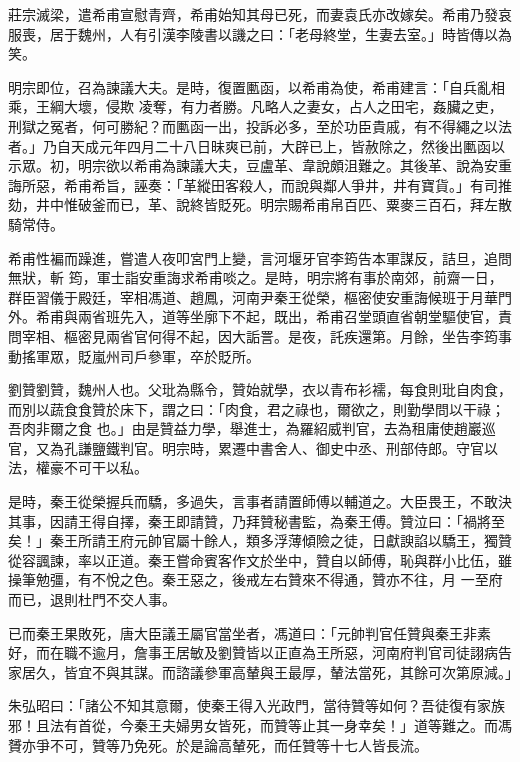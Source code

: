 \begin{pinyinscope}
 莊宗滅梁，遣希甫宣慰青齊，希甫始知其母已死，而妻袁氏亦改嫁矣。希甫乃發哀服喪，居于魏州，人有引漢李陵書以譏之曰：「老母終堂，生妻去室。」時皆傳以為笑。



 明宗即位，召為諫議大夫。是時，復置匭函，以希甫為使，希甫建言：「自兵亂相乘，王綱大壞，侵欺
 凌奪，有力者勝。凡略人之妻女，占人之田宅，姦臟之吏，刑獄之冤者，何可勝紀？而匭函一出，投訴必多，至於功臣貴戚，有不得繩之以法者。」乃自天成元年四月二十八日昧爽已前，大辟已上，皆赦除之，然後出匭函以示眾。初，明宗欲以希甫為諫議大夫，豆盧革、韋說頗沮難之。其後革、說為安重誨所惡，希甫希旨，誣奏：「革縱田客殺人，而說與鄰人爭井，井有寶貨。」有司推劾，井中惟破釜而已，革、說終皆貶死。明宗賜希甫帛百匹、粟麥三百石，拜左散騎常侍。



 希甫性褊而躁進，嘗遣人夜叩宮門上變，言河堰牙官李筠告本軍謀反，詰旦，追問無狀，斬
 筠，軍士詣安重誨求希甫啖之。是時，明宗將有事於南郊，前齋一日，群臣習儀于殿廷，宰相馮道、趙鳳，河南尹秦王從榮，樞密使安重誨候班于月華門外。希甫與兩省班先入，道等坐廓下不起，既出，希甫召堂頭直省朝堂驅使官，責問宰相、樞密見兩省官何得不起，因大詬詈。是夜，託疾還第。月餘，坐告李筠事動搖軍眾，貶嵐州司戶參軍，卒於貶所。



 劉贊劉贊，魏州人也。父玭為縣令，贊始就學，衣以青布衫襦，每食則玭自肉食，而別以蔬食食贊於床下，謂之曰：「肉食，君之祿也，爾欲之，則勤學問以干祿；吾肉非爾之食
 也。」由是贊益力學，舉進士，為羅紹威判官，去為租庸使趙巖巡官，又為孔謙鹽鐵判官。明宗時，累遷中書舍人、御史中丞、刑部侍郎。守官以法，權豪不可干以私。



 是時，秦王從榮握兵而驕，多過失，言事者請置師傅以輔道之。大臣畏王，不敢決其事，因請王得自擇，秦王即請贊，乃拜贊秘書監，為秦王傅。贊泣曰：「禍將至矣！」秦王所請王府元帥官屬十餘人，類多浮薄傾險之徒，日獻諛諂以驕王，獨贊從容諷諫，率以正道。秦王嘗命賓客作文於坐中，贊自以師傅，恥與群小比伍，雖操筆勉彊，有不悅之色。秦王惡之，後戒左右贊來不得通，贊亦不往，月
 一至府而已，退則杜門不交人事。



 已而秦王果敗死，唐大臣議王屬官當坐者，馮道曰：「元帥判官任贊與秦王非素好，而在職不逾月，詹事王居敏及劉贊皆以正直為王所惡，河南府判官司徒詡病告家居久，皆宜不與其謀。而諮議參軍高輦與王最厚，輦法當死，其餘可次第原減。」



 朱弘昭曰：「諸公不知其意爾，使秦王得入光政門，當待贊等如何？吾徒復有家族邪！且法有首從，今秦王夫婦男女皆死，而贊等止其一身幸矣！」道等難之。而馮贇亦爭不可，贊等乃免死。於是論高輦死，而任贊等十七人皆長流。




\end{pinyinscope}
